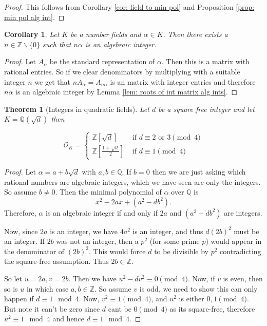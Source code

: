 \documentclass[11pt,a4paper]{report}
\theoremstyle{plain}
\newtheorem{thm}[subsection]{Theorem}
\newtheorem{cor}[subsection]{Corollary}
\theoremstyle{definition}
\theoremstyle{definition}
\newcommand{\ZZ}{\mathbb{Z}}
\def\QQ{\mathbb{Q}}
\def \a{\alpha}
\def \OO {\mathcal{O}}
\begin{document}
	
	
	\begin{proof}
		This follows from Corollary \ref{cor: field to min pol} and Proposition \ref{prop: min pol alg int}.
	\end{proof}
	
	\begin{cor}
		Let $K$ be a number fields and $\a \in K$. Then there exists a $n \in \ZZ\backslash\{0\}$ such that $n \a$ is an algebraic integer.  
	\end{cor}
	
	\begin{proof}
		Let $A_\a$ be the standard representation of $\a$. Then this is a matrix with rational entries. So if we clear denominators by multiplying with a suitable integer $n$ we get that $n A_\a=A_{n\a}$ is an matrix with integer entries and therefore $n\a$ is an algebraic integer by Lemma \ref{lem: roots of int matrix alg ints}.
	\end{proof}
	
	
	
	\begin{thm}[Integers in quadratic fields]\label{thm: int quad field} Let $d$ be a square free integer and let $K=\QQ(\sqrt{d})$ then
		
		\[\OO_K= \begin{cases}
			\ZZ[\sqrt{d}] & \text{ if } d\equiv 2 \text{ or } 3 \pmod 4 \\
			\ZZ[\frac{1+\sqrt{d}}{2}] &  \text{ if } d\equiv 1 \pmod 4
		\end{cases}   \]
		
		
		
	\end{thm}
	
	\begin{proof}
		Let $\a=a+b\sqrt{d}$ with $a,b \in \QQ$. If $b=0$ then we are just asking which rational numbers are algebraic integers, which we have seen are only the integers. So assume $b \neq 0$. Then the minimal polynomial of $\a$ over $\QQ$ is \[x^2-2ax+ (a^2-db^2).\] Therefore, $\a$ is an algebraic integer if and only if $2a$ and  $(a^2-db^2)$ are integers.
		
		
		
		Now, since $2a$ is an integer, we have $4a^2$ is an integer, and thus $d(2b)^2$ must be an integer. If $2b$ was not an integer, then  a $p^2$ (for some prime $p$) would appear in the denominator of $(2b)^2$. This would force $d$ to be divisible by $p^2$ contradicting the square-free assumption. Thus $2b \in \ZZ$.
		
		So let $u=2a,v=2b$. Then we have $u^2-dv^2 \equiv 0 \pmod 4$. Now, if $v$ is even, then so is $u$ in which case $a,b \in \ZZ$. So assume $v$ is odd, we need to show this can only happen if $d \equiv 1 \mod 4$. Now, $v^2 \equiv 1 \pmod 4$, and $u^2$ is either $0,1 \pmod 4$. But note it can't be zero since $d$ cant be $0 \pmod 4$ as its square-free, therefore $u^2 \equiv 1 \mod 4$ and hence $d \equiv 1 \mod 4$.	
	\end{proof}
	
\end{document}
